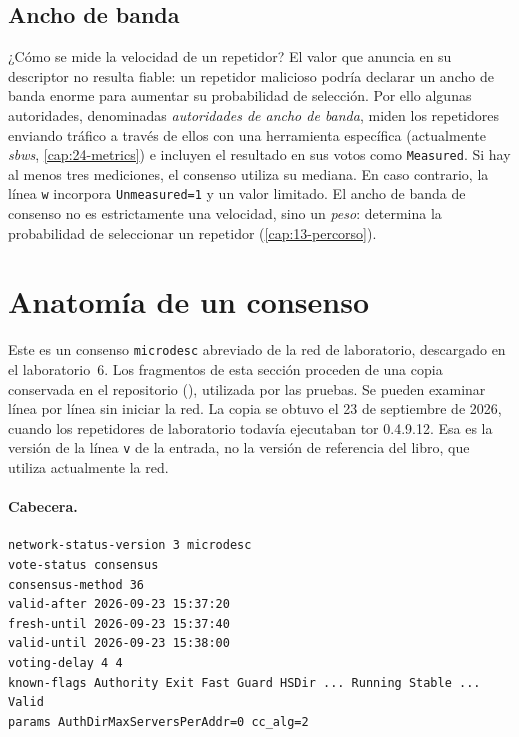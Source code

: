 \subsection{Ancho de banda}

¿Cómo se mide la velocidad de un repetidor? El valor que anuncia en su descriptor no resulta fiable: un repetidor malicioso podría declarar un ancho de banda enorme para aumentar su probabilidad de selección. Por ello algunas autoridades, denominadas \emph{autoridades de ancho de banda}, miden los repetidores enviando tráfico a través de ellos con una herramienta específica (actualmente \emph{sbws}, \cref{cap:24-metrics}) e incluyen el resultado en sus votos como \texttt{Measured}. Si hay al menos tres mediciones, el consenso utiliza su mediana. En caso contrario, la línea \texttt{w} incorpora \texttt{Unmeasured=1} y un valor limitado. El ancho de banda de consenso no es estrictamente una velocidad, sino un \emph{peso}: determina la probabilidad de seleccionar un repetidor (\cref{cap:13-percorso}).

\section{Anatomía de un consenso}\label{sec:dir-anatomia}

Este es un consenso \texttt{microdesc} abreviado de la red de laboratorio, descargado en el laboratorio~6. Los fragmentos de esta sección proceden de una copia conservada en el repositorio (), utilizada por las pruebas. Se pueden examinar línea por línea sin iniciar la red. La copia se obtuvo el 23 de septiembre de 2026, cuando los repetidores de laboratorio todavía ejecutaban tor 0.4.9.12. Esa es la versión de la línea \texttt{v} de la entrada, no la versión de referencia del libro, que utiliza actualmente la red.

\paragraph{Cabecera.}
\begin{lstlisting}[numbers=none]
network-status-version 3 microdesc
vote-status consensus
consensus-method 36
valid-after 2026-09-23 15:37:20
fresh-until 2026-09-23 15:37:40
valid-until 2026-09-23 15:38:00
voting-delay 4 4
known-flags Authority Exit Fast Guard HSDir ... Running Stable ... Valid
params AuthDirMaxServersPerAddr=0 cc_alg=2
\end{lstlisting}

